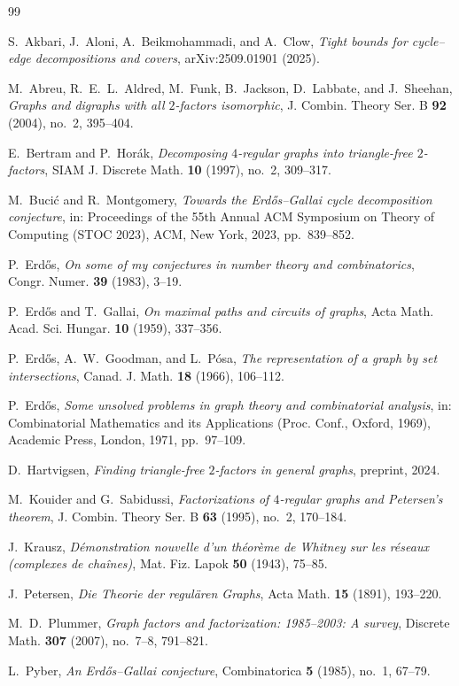 \documentclass[11pt,reqno]{amsart}
\theoremstyle{definition}
\theoremstyle{remark}
\begin{document}
\begin{thebibliography}{99}

S.~Akbari, J.~Aloni, A.~Beikmohammadi, and A.~Clow,
\emph{Tight bounds for cycle--edge decompositions and covers},
arXiv:2509.01901 (2025).

M.~Abreu, R.~E.~L.~Aldred, M.~Funk, B.~Jackson, D.~Labbate, and J.~Sheehan,
\emph{Graphs and digraphs with all $2$-factors isomorphic},
J. Combin. Theory Ser. B \textbf{92} (2004), no.~2, 395--404.

E.~Bertram and P.~Hor\'ak,
\emph{Decomposing $4$-regular graphs into triangle-free $2$-factors},
SIAM J. Discrete Math. \textbf{10} (1997), no.~2, 309--317.

M.~Buci\'c and R.~Montgomery,
\emph{Towards the Erd\H{o}s--Gallai cycle decomposition conjecture},
in: Proceedings of the 55th Annual ACM Symposium on Theory of Computing (STOC 2023),
ACM, New York, 2023, pp.~839--852.

P.~Erd\H{o}s,
\emph{On some of my conjectures in number theory and combinatorics},
Congr. Numer. \textbf{39} (1983), 3--19.

P.~Erd\H{o}s and T.~Gallai,
\emph{On maximal paths and circuits of graphs},
Acta Math. Acad. Sci. Hungar. \textbf{10} (1959), 337--356.

P.~Erd\H{o}s, A.~W.~Goodman, and L.~P\'osa,
\emph{The representation of a graph by set intersections},
Canad. J. Math. \textbf{18} (1966), 106--112.

P.~Erd\H{o}s,
\emph{Some unsolved problems in graph theory and combinatorial analysis},
in: Combinatorial Mathematics and its Applications (Proc. Conf., Oxford, 1969),
Academic Press, London, 1971, pp.~97--109.

D.~Hartvigsen,
\emph{Finding triangle-free $2$-factors in general graphs},
preprint, 2024.

M.~Kouider and G.~Sabidussi,
\emph{Factorizations of $4$-regular graphs and Petersen's theorem},
J. Combin. Theory Ser. B \textbf{63} (1995), no.~2, 170--184.

J.~Krausz,
\emph{D\'emonstration nouvelle d'un th\'eor\`eme de Whitney sur les r\'eseaux (complexes de cha\^ines)},
Mat. Fiz. Lapok \textbf{50} (1943), 75--85.

J.~Petersen,
\emph{Die Theorie der regul\"aren Graphs},
Acta Math. \textbf{15} (1891), 193--220.

M.~D.~Plummer,
\emph{Graph factors and factorization: 1985--2003: A survey},
Discrete Math. \textbf{307} (2007), no.~7--8, 791--821.

L.~Pyber,
\emph{An Erd\H{o}s--Gallai conjecture},
Combinatorica \textbf{5} (1985), no.~1, 67--79.

\end{thebibliography}
\end{document}
